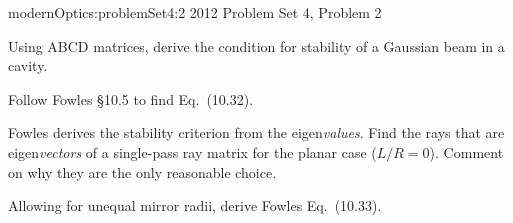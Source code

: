 {modernOptics:problemSet4:2}
{2012 Problem Set 4, Problem 2}
{
Using ABCD matrices, derive the condition for stability of a Gaussian beam in a cavity.

Follow Fowles \S 10.5 to find Eq.~(10.32).

Fowles derives the stability criterion from the eigen{\em{values}}. Find the rays that are eigen{\em{vectors}} of a single-pass ray matrix for the planar case ($L/R = 0$). Comment on why they are the only reasonable choice.

Allowing for unequal mirror radii, derive Fowles Eq.~(10.33).
} %


